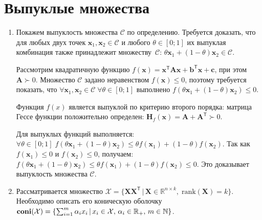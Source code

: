 \documentclass[a4paper,12pt]{article}
\begin{document}
	\section{Выпуклые множества}
	
	\begin{enumerate}
		\item 
		
		Покажем выпуклость множества $\mathcal{C}$  по определению. Требуется доказать, что для любых двух точек $ \mathbf{x}_1, \mathbf{x}_2 \in \mathcal{C}$ и любого $ \theta \in [0;1]$ их выпуклая комбинация также принадлежит множеству~$\mathcal{C}$: $\theta \mathbf{x}_1 + (1-\theta) 
		\mathbf{x}_2 \in \mathcal{C}$.
		
		Рассмотрим квадратичную функцию $f(\mathbf{x}) = \mathbf{x}^\mathsf{T} \mathbf{A} \mathbf{x} + \mathbf{b}^\mathsf{T} \mathbf{x} + \mathbf{c}$, при этом $\mathbf{A} \succ 0$. Множество $\mathcal{C}$ задано неравенством $f(\mathbf{x}) \leqslant 0$, поэтому требуется показать, что $\forall \mathbf{x}_1, \mathbf{x}_2 \in \mathcal{C}\; \forall \theta \in [0;1] $ выполнено $f (\theta \mathbf{x}_1 + (1-\theta) \mathbf{x}_2 ) \leqslant 0$.
		
		Функция $f(x)$ является выпуклой по критерию второго порядка: матрица Гессе функции  положительно определен: $\mathbf{H}_f(\mathbf{x}) = \mathbf{A} + \mathbf{A}^\mathsf{T} \succ 0 $. 
		
		Для выпуклых функций выполняется: $\forall \theta \in [0;1]\; f(\theta \mathbf{x}_1 + (1-\theta) \mathbf{x}_2) \leqslant \theta f(\mathbf{x}_1) + (1-\theta) f(\mathbf{x}_2)$. Так как $f( \mathbf{x}_1) \leqslant 0$ и $f( \mathbf{x}_2) \leqslant 0$, получаем: $f(\theta \mathbf{x}_1 + (1-\theta) \mathbf{x}_2) \leqslant \theta f(\mathbf{x}_1) + (1-\theta) f(\mathbf{x}_2) \leqslant 0$. Это доказывает выпуклость множества $\mathcal{C}$.
		
		\item
		
		Рассматривается множество $\mathcal{X} = \{\mathbf{X}\mathbf{X}^\mathsf{T} \,|\, \mathbf{X} \in \mathbb{R}^{n\times k},\; \text{rank}(\mathbf{X})=k\}$. 
		Необходимо описать его коническую оболочку $\text{\textbf{coni}}(\mathcal{X}) = \{\sum_{i=1}^{m} \alpha_i 
		x_i \,|\, x_i \in \mathcal{X},\, \alpha_i \in \mathbb{R}_{+},\, m\in \mathbb{N}\}$. 
		

\end{enumerate}
\end{document}
